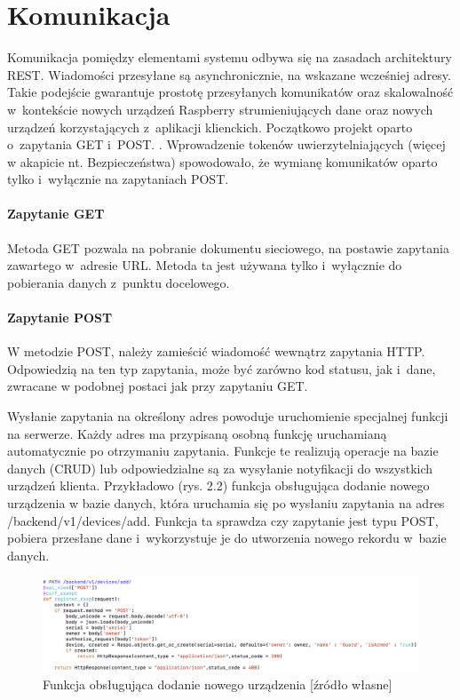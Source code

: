 \section{Komunikacja}

Komunikacja pomiędzy elementami systemu odbywa się na zasadach architektury REST. Wiadomości przesyłane są asynchronicznie, na wskazane wcześniej adresy.
Takie podejście gwarantuje prostotę przesyłanych komunikatów oraz skalowalność w~kontekście nowych urządzeń Raspberry strumieniujących dane oraz nowych urządzeń korzystających z~aplikacji klienckich. Początkowo projekt oparto o~zapytania GET i~POST.  \cite{WEBARCH}. Wprowadzenie tokenów uwierzytelniających (więcej w akapicie nt. Bezpieczeństwa) spowodowało, że wymianę komunikatów oparto tylko i~wyłącznie na zapytaniach POST. 

\paragraph{Zapytanie GET}
Metoda GET pozwala na pobranie dokumentu sieciowego, na postawie zapytania zawartego w~adresie URL. Metoda ta jest używana tylko i~wyłącznie do pobierania danych z~punktu docelowego. 

\paragraph{Zapytanie POST}
W metodzie POST, należy zamieścić wiadomość wewnątrz zapytania HTTP. Odpowiedzią na ten typ zapytania, może być zarówno kod statusu, jak i~dane, zwracane w podobnej postaci jak przy zapytaniu GET.

Wysłanie zapytania na określony adres powoduje uruchomienie specjalnej funkcji na serwerze. Każdy adres ma przypisaną osobną funkcję uruchamianą automatycznie po otrzymaniu zapytania. Funkcje te realizują operacje na bazie danych (CRUD) lub odpowiedzialne są za wysyłanie notyfikacji do wszystkich urządzeń klienta. Przykładowo (rys. 2.2) funkcja obsługująca dodanie nowego urządzenia w bazie danych, która uruchamia się po wysłaniu zapytania na adres /backend/v1/devices/add. Funkcja ta sprawdza czy zapytanie jest typu POST, pobiera przesłane dane i~wykorzystuje je do utworzenia nowego rekordu w~bazie danych.
\begin{figure}[ht] 
   \centering
   \includegraphics[width=14cm]{backend.png} 
   \caption{Funkcja obsługująca dodanie nowego urządzenia [źródło własne]}
\end{figure}

